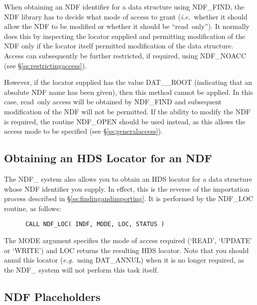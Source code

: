 \documentclass[twoside,11pt]{article}
\newcommand{\htmlref}[2]{#1}
\newcommand{\xref}[3]{#1}
\newcommand{\xlabel}[1]{}
\newcommand{\st}[1]{{\em{#1}}}
\begin{document}
When obtaining an NDF identifier for a data structure using \htmlref{NDF\_FIND}{NDF_FIND},
the NDF library has to decide what mode of access to grant
(\st{i.e.}\ whether it should allow the NDF to be modified or whether it  
should be ``read~only''). It normally does this by inspecting the
\xref{locator}{sun92}{using_locators} supplied and permitting
modification of the NDF only if the
locator itself permitted modification of the data structure. Access
can subsequently be further restricted, if required, using \htmlref{NDF\_NOACC}{NDF_NOACC}
(see \S\ref{ss:restrictingaccess}).

However, if the locator supplied has the value DAT\_\_ROOT (indicating
that an absolute NDF name has been given), then this method cannot be
applied. In this case, read~only access will be obtained by NDF\_FIND
and subsequent modification of the NDF will not be permitted. If the
ability to modify the NDF is required, the routine \htmlref{NDF\_OPEN}{NDF_OPEN} should be
used instead, as this allows the access mode to be specified (see
\S\ref{ss:generalaccess}).

\subsection{\xlabel{obtaining_an_hds_locator_for_an_ndf}\label{ss:gettingalocator}Obtaining an HDS Locator for an NDF}

The NDF\_ system also allows you to obtain an \xref{HDS
locator}{sun92}{using_locators} for a data structure whose NDF
identifier you supply. In effect, this is the reverse of the
importation process described in \S\ref{ss:findingandimporting}. It is
performed by the \htmlref{NDF\_LOC}{NDF_LOC} routine, as follows:

\small
\begin{verbatim}
      CALL NDF_LOC( INDF, MODE, LOC, STATUS )
\end{verbatim}
\normalsize

The MODE argument specifies the mode of access required (`READ', `UPDATE' or
`WRITE') and LOC returns the resulting HDS locator. Note that you should annul
this locator (\st{e.g.}\ using \xref{DAT\_ANNUL}{sun92}{DAT_ANNUL})
when it is no longer required, as the NDF\_ system will not perform
this task itself.

\subsection{\xlabel{ndf_placeholders}\label{ss:placeholders}NDF Placeholders}
\end{document}
